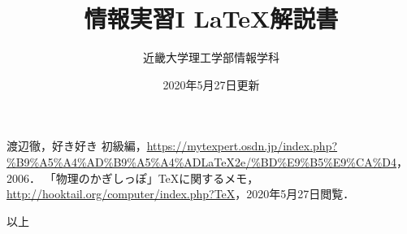 \documentclass[a4j]{jsarticle}
\begin{document}
\title{情報実習I \LaTeX 解説書}
\date{2020年5月27日更新}
\author{近畿大学理工学部情報学科}

\maketitle








\begin{thebibliography}{1}
    渡辺徹，好き好き \LaTeXe 初級編，\url{https://mytexpert.osdn.jp/index.php?%B9%A5%A4%AD%B9%A5%A4%ADLaTeX2e/%BD%E9%B5%E9%CA%D4}，2006．
    「物理のかぎしっぽ」\TeX に関するメモ，\url{http://hooktail.org/computer/index.php?TeX}，2020年5月27日閲覧．
\end{thebibliography}

\begin{flushright}
以上
\end{flushright}
\end{document}
